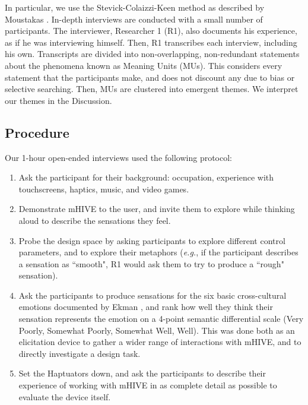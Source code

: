 In particular, we use the Stevick-Colaizzi-Keen method as described by Moustakas \cite{Moustakas1994}.
In-depth interviews are conducted with a small number of participants.
The interviewer, Researcher 1 (R1), also documents his experience, as if he was interviewing himself.
Then, R1 transcribes each interview, including his own.
Transcripts are divided into non-overlapping, non-redundant statements about the phenomena known as Meaning Units (MUs).
This considers every statement that the participants make, and does not discount any due to bias or selective searching.
%
Then, MUs are clustered into emergent themes. %
%
We interpret our themes in the Discussion.

\subsection{Procedure}
Our 1-hour open-ended interviews
used the following protocol:
\begin{enumerate}
	\item Ask the participant for their background: occupation, experience with touchscreens, haptics, music, and video games.
	\item Demonstrate mHIVE to the user, and invite them to explore while thinking aloud to describe the sensations they feel.
	\item Probe the design space by asking participants to explore different control parameters, and to explore their metaphors (\emph{e.g.}, if the participant describes a sensation as ``smooth", R1 would ask them to try to produce a ``rough" sensation).
	\item Ask the participants to produce sensations for the six basic cross-cultural emotions documented by Ekman \cite{Ekman1992}, and rank how well they think their sensation represents the emotion on a 4-point semantic differential scale (Very Poorly, Somewhat Poorly, Somewhat Well, Well). This was done both as an elicitation device to gather a wider range of interactions with mHIVE, and to directly investigate a design task.
	\item Set the Haptuators down, and ask the participants to describe their experience of working with mHIVE in as complete detail as possible to evaluate the device itself.
\end{enumerate}

